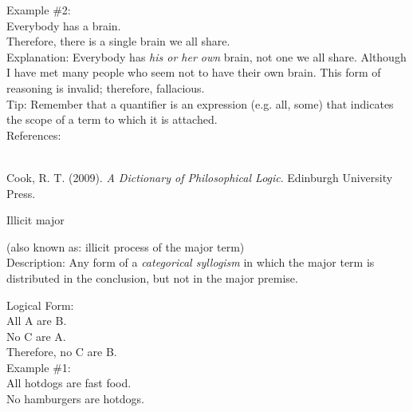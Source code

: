 \documentclass[a4paper,12pt,single,pdftex]{scrartcl}
\begin{document}
    
      Example \#2:
    \\

    
      Everybody has a brain.
    \\

    
      Therefore, there is a single brain we all share.
    \\

    
      Explanation: Everybody has {\it his or her own} brain, not one we all share.  Although I have met many people who seem not to have their own brain.  This form of reasoning is invalid; therefore, fallacious.
    \\

    
      Tip: Remember that a quantifier is an expression (e.g. all, some) that indicates the scope of a term to which it is attached.
    \\

    References:

    
      
        
      \\

      
        
          Cook, R. T. (2009). {\it A Dictionary of Philosophical Logic}. Edinburgh University Press.
        
      
    
  

Illicit major
    
      (also known as: illicit process of the major term)
    \\

  
    Description: Any form of a {\it categorical syllogism} in which the major term is distributed in the conclusion, but not in the major premise.

    
      Logical Form:
    \\

    
      All A are B.
    \\

    
      No C are A.
    \\

    
      Therefore, no C are B.
    \\

    
      Example \#1:
    \\

    
      All hotdogs are fast food.
    \\

    
      No hamburgers are hotdogs.
    \\
\end{document}
